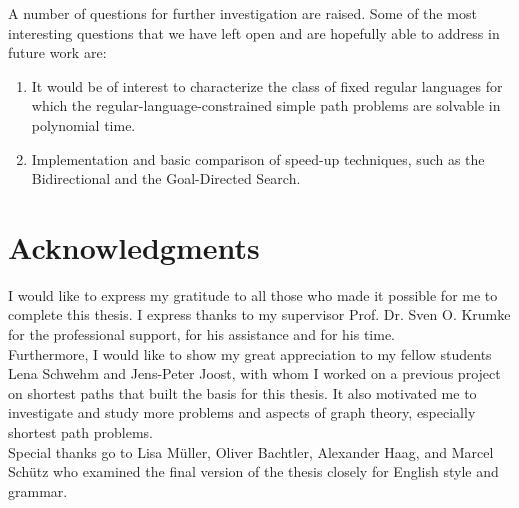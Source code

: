 \documentclass[]{article}
\numberwithin{equation}{section}
\begin{document}
A number of questions for further investigation are raised. Some of the most interesting questions that we have left open and are hopefully able to address in future work are:

\begin{enumerate}
	\item It would be of interest to characterize the class of fixed regular languages for which the regular-language-constrained simple path problems are solvable in polynomial time.
	
	\item Implementation and basic comparison of speed-up techniques, such as the Bidirectional and the Goal-Directed Search.
\end{enumerate}

\newpage

\section*{Acknowledgments}
\label{sec:acknowledge}

I would like to express my gratitude to all those who made it possible for me to complete this thesis. I express thanks to my supervisor Prof. Dr. Sven O. Krumke for the professional support, for his assistance and for his time.\\

Furthermore, I would like to show my great appreciation to my fellow students Lena Schwehm and Jens-Peter Joost, with whom I worked on a previous project on shortest paths that built the basis for this thesis. It also motivated me to investigate and study more problems and aspects of graph theory, especially shortest path problems.\\

Special thanks go to Lisa M\"uller, Oliver Bachtler, Alexander Haag, and Marcel Sch\"utz who examined the final version of the thesis closely for English style and grammar.

\newpage
\end{document}
